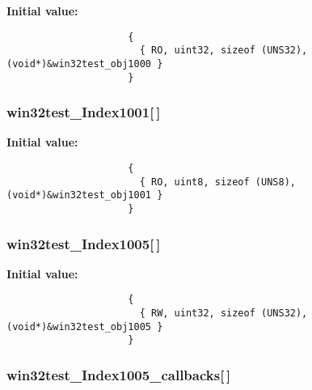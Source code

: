\textbf{Initial value:}

\begin{Code}\begin{verbatim} 
                     {
                       { RO, uint32, sizeof (UNS32), (void*)&win32test_obj1000 }
                     }
\end{verbatim}\end{Code}
\subsubsection{ {\bf win32test\_\-Index1001}[$\,$]}\label{win32test_8c_94439de2330dfbe25fd901a95ac840ff}


\textbf{Initial value:}

\begin{Code}\begin{verbatim} 
                     {
                       { RO, uint8, sizeof (UNS8), (void*)&win32test_obj1001 }
                     }
\end{verbatim}\end{Code}
\subsubsection{ {\bf win32test\_\-Index1005}[$\,$]}\label{win32test_8c_71199cd8e138dcfff0fbee857843b221}


\textbf{Initial value:}

\begin{Code}\begin{verbatim} 
                     {
                       { RW, uint32, sizeof (UNS32), (void*)&win32test_obj1005 }
                     }
\end{verbatim}\end{Code}
\subsubsection{ {\bf win32test\_\-Index1005\_\-callbacks}[$\,$]}\label{win32test_8c_e0df0c13eb1dcd2390df4b55493180ce}


